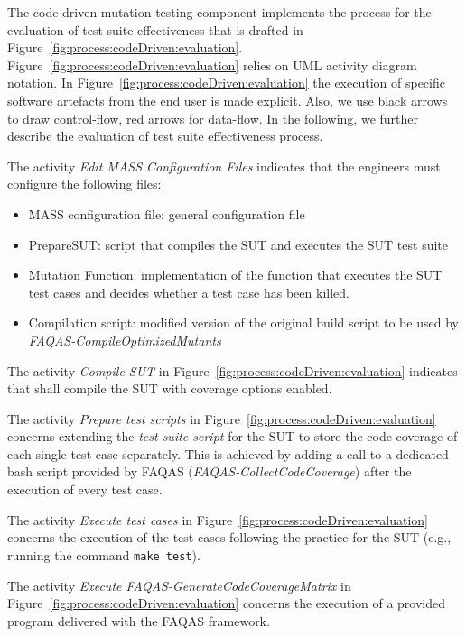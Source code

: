 The code-driven mutation testing component implements the process for the evaluation of test suite effectiveness that is drafted in Figure~\ref{fig:process:codeDriven:evaluation}. Figure~\ref{fig:process:codeDriven:evaluation} relies on UML activity diagram notation. In Figure~\ref{fig:process:codeDriven:evaluation} the execution of specific software artefacts from the end user is made explicit. Also, we use black arrows to draw control-flow, red arrows for data-flow. In the following, we further describe the evaluation of test suite effectiveness process.


The activity \emph{Edit MASS Configuration Files} indicates that the engineers must configure the following files:
\begin{itemize}
	\item MASS configuration file: general configuration file
	\item PrepareSUT: script that compiles the SUT and executes the SUT test suite
	\item Mutation Function: implementation of the function that executes the SUT test cases and decides whether a test case has been killed.
	\item Compilation script: modified version of the original build script to be used by \emph{FAQAS-CompileOptimizedMutants}
\end{itemize}


The activity \emph{Compile SUT} in Figure~\ref{fig:process:codeDriven:evaluation} indicates that \MASS shall compile the SUT with coverage options enabled.

The activity \emph{Prepare test scripts} in Figure~\ref{fig:process:codeDriven:evaluation} concerns extending the \emph{test suite script} for the SUT to store the code coverage of each single test case separately. This is achieved by adding a call to a dedicated bash script provided by FAQAS (\emph{FAQAS-CollectCodeCoverage}) after the execution of every test case.

The activity \emph{Execute test cases} in Figure~\ref{fig:process:codeDriven:evaluation} concerns the execution of the test cases following the practice for the SUT (e.g., running the command \texttt{make test}).

The activity \emph{Execute FAQAS-GenerateCodeCoverageMatrix} in Figure~\ref{fig:process:codeDriven:evaluation} concerns the execution of a provided program delivered with the FAQAS framework.

